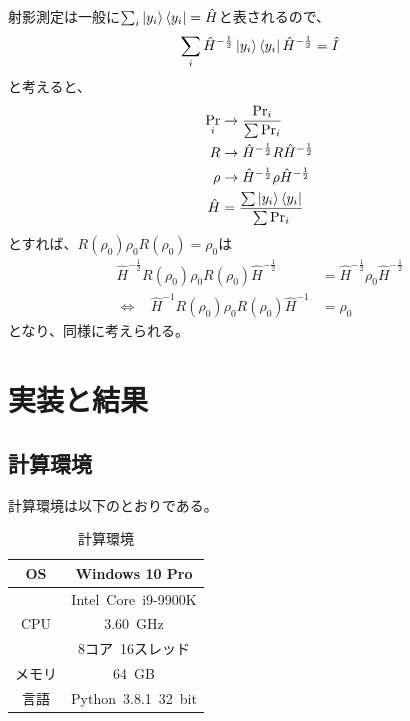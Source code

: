 \documentclass[11pt,a4j,notitlepage]{jreport}
\begin{document}
	射影測定は一般に$\sum_i \ket{y_i} \bra{y_i} = \hat{H}$と表されるので、
	\begin{equation}
		\sum_i \hat{H}^{- \frac{1}{2}} \ket{y_i} \bra{y_i} \hat{H}^{- \frac{1}{2}} = \hat{I}
	\end{equation}
	と考えると、
	\begin{equation*}
		\begin{aligned}
			\Pr_i &\to \frac{\Pr_i}{\sum \Pr_i} \\
			R &\to \hat{H}^{- \frac{1}{2}} R \hat{H}^{- \frac{1}{2}} \\
			\rho &\to \hat{H}^{- \frac{1}{2}} \rho \hat{H}^{- \frac{1}{2}} \\
			\hat{H} &= \frac{\sum \ket{y_i} \bra{y_i}}{\sum \Pr_i}
		\end{aligned}
	\end{equation*}
	とすれば、$R (\rho_0) \rho_0 R (\rho_0) = \rho_0$は
	\begin{equation}
		\begin{aligned}
			\hat{H}^{- \frac{1}{2}} R (\rho_0) \rho_0 R (\rho_0) \hat{H}^{- \frac{1}{2}} &= \hat{H}^{- \frac{1}{2}} \rho_0 \hat{H}^{- \frac{1}{2}} \\
			\Longleftrightarrow\ \ \ \  \hat{H}^{-1} R (\rho_0) \rho_0 R (\rho_0) \hat{H}^{-1} &= \rho_0
		\end{aligned}
	\end{equation}
	となり、同様に考えられる。

	\chapter{実装と結果}

	\section{計算環境}

	計算環境は以下のとおりである。

	\begin{table}[h]
		\centering
			\caption{計算環境}
			\begin{tabular}{|c|c|}
				\hline
				OS & Windows 10 Pro \\ \hline
				& Intel\ Core\ i9-9900K \\
				CPU & 3.60\ GHz \\
				& 8コア\ 16スレッド　\\ \hline
				メモリ & 64\ GB \\ \hline
				言語 & Python\ 3.8.1\ 32\ bit \\ \hline
			\end{tabular}
	\end{table}
\end{document}
